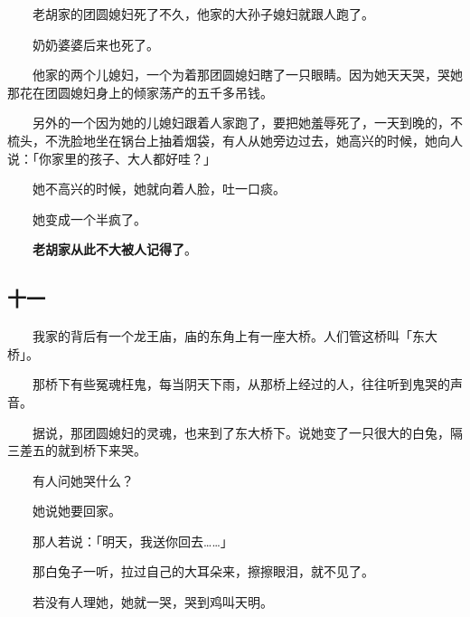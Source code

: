 \documentclass[UTF8]{ctexart}
\begin{document}
　　老胡家的团圆媳妇死了不久，他家的大孙子媳妇就跟人跑了。

　　奶奶婆婆后来也死了。

　　他家的两个儿媳妇，一个为着那团圆媳妇瞎了一只眼睛。因为她天天哭，哭她那花在团圆媳妇身上的倾家荡产的五千多吊钱。

　　另外的一个因为她的儿媳妇跟着人家跑了，要把她羞辱死了，一天到晚的，不梳头，不洗脸地坐在锅台上抽着烟袋，有人从她旁边过去，她高兴的时候，她向人说：「你家里的孩子、大人都好哇？」

　　她不高兴的时候，她就向着人脸，吐一口痰。

　　她变成一个半疯了。

　　\textbf{老胡家从此不大被人记得了}。

\subsection{十一}

　　我家的背后有一个龙王庙，庙的东角上有一座大桥。人们管这桥叫「东大桥」。

　　那桥下有些冤魂枉鬼，每当阴天下雨，从那桥上经过的人，往往听到鬼哭的声音。

　　据说，那团圆媳妇的灵魂，也来到了东大桥下。说她变了一只很大的白兔，隔三差五的就到桥下来哭。

　　有人问她哭什么？

　　她说她要回家。

　　那人若说：「明天，我送你回去……」

　　那白兔子一听，拉过自己的大耳朵来，擦擦眼泪，就不见了。

　　若没有人理她，她就一哭，哭到鸡叫天明。
\end{document}
